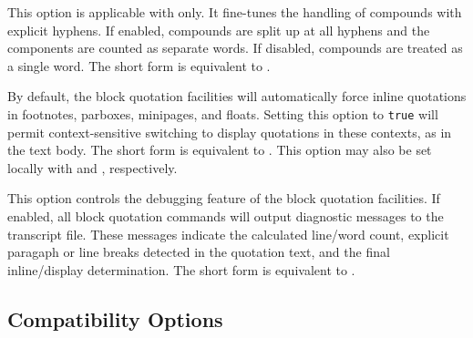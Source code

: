 \documentclass{ltxdockit}[2010/09/26]
\begin{document}
\begin{optionlist}

This option is applicable with  only. It fine-tunes the handling of compounds with explicit hyphens. If enabled, compounds are split up at all hyphens and the components are counted as separate words. If disabled, compounds are treated as a single word. The short form  is equivalent to .


By default, the block quotation facilities will automatically force inline quotations in footnotes, parboxes, minipages, and floats. Setting this option to \texttt{true} will permit context-sensitive switching to display quotations in these contexts, as in the text body. The short form  is equivalent to . This option may also be set locally with  and , respectively.


This option controls the debugging feature of the block quotation facilities. If enabled, all block quotation commands will output diagnostic messages to the transcript file. These messages indicate the calculated line\slash word count, explicit paragaph or line breaks detected in the quotation text, and the final inline\slash display determination. The short form  is equivalent to .

\end{optionlist}

\subsection{Compatibility Options}
\label{opt:leg}
\end{document}
